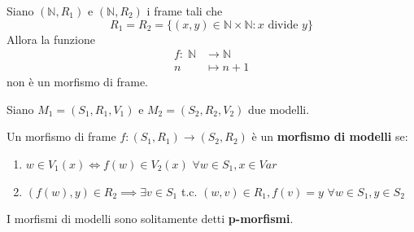 \documentclass[../main.tex]{subfiles}
\begin{document}
\begin{example}
    Siano $(\mathbb{N}, R_1)$ e $(\mathbb{N}, R_2)$ i frame tali che
    \begin{equation*}
        R_1 = R_2 = \{(x,y) \in \mathbb{N} \times \mathbb{N} : x \text{ divide } y\}
    \end{equation*}
    Allora la funzione
    \begin{align*}
        f : \; \mathbb{N} & \rightarrow \mathbb{N} \\
        n                 & \mapsto n+1
    \end{align*}
    non è un morfismo di frame.
\end{example}
\begin{definition}
    Siano $M_1 = (S_1, R_1, V_1)$ e $M_2 = (S_2, R_2, V_2)$ due modelli.

    Un morfismo di frame $f: (S_1, R_1) \rightarrow (S_2, R_2)$ è un \textbf{morfismo di modelli} se:
    \begin{enumerate}
        \item $w \in V_1(x) \iff f(w) \in V_2(x)$ $\forall w \in S_1, x \in Var$
        \item $(f(w),y) \in R_2 \implies \exists v \in S_1$ t.c. $(w,v) \in R_1, f(v) = y$ $\forall w \in S_1, y \in S_2$
    \end{enumerate}
\end{definition}
\begin{note}
    I morfismi di modelli sono solitamente detti \textbf{p-morfismi}.
\end{note}
\end{document}
